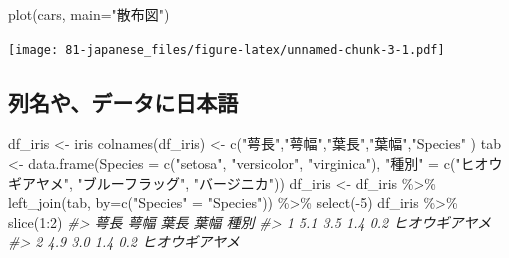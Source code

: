 \documentclass[
]{bxjsbook}
\newenvironment{Shaded}{\begin{snugshade}}{\end{snugshade}}
\newcommand{\AttributeTok}[1]{\textcolor[rgb]{0.77,0.63,0.00}{#1}}
\newcommand{\CommentTok}[1]{\textcolor[rgb]{0.56,0.35,0.01}{\textit{#1}}}
\newcommand{\DecValTok}[1]{\textcolor[rgb]{0.00,0.00,0.81}{#1}}
\newcommand{\FunctionTok}[1]{\textcolor[rgb]{0.00,0.00,0.00}{#1}}
\newcommand{\NormalTok}[1]{#1}
\newcommand{\OtherTok}[1]{\textcolor[rgb]{0.56,0.35,0.01}{#1}}
\newcommand{\SpecialCharTok}[1]{\textcolor[rgb]{0.00,0.00,0.00}{#1}}
\newcommand{\StringTok}[1]{\textcolor[rgb]{0.31,0.60,0.02}{#1}}
\theoremstyle{definition}
\theoremstyle{definition}
\theoremstyle{definition}
\theoremstyle{definition}
\theoremstyle{remark}
\begin{document}
\begin{Shaded}
\begin{Highlighting}[]
\FunctionTok{plot}\NormalTok{(cars, }\AttributeTok{main=}\StringTok{"散布図"}\NormalTok{)}
\end{Highlighting}
\end{Shaded}

\texttt{[image: 81-japanese\_files/figure-latex/unnamed-chunk-3-1.pdf]}

\hypertarget{ux5217ux540dux3084ux30c7ux30fcux30bfux306bux65e5ux672cux8a9e}{%
\subsection{列名や、データに日本語}\label{ux5217ux540dux3084ux30c7ux30fcux30bfux306bux65e5ux672cux8a9e}}

\begin{Shaded}
\begin{Highlighting}[]
\NormalTok{df\_iris }\OtherTok{\textless{}{-}}\NormalTok{ iris}
\FunctionTok{colnames}\NormalTok{(df\_iris) }\OtherTok{\textless{}{-}} \FunctionTok{c}\NormalTok{(}\StringTok{"萼長"}\NormalTok{,}\StringTok{"萼幅"}\NormalTok{,}\StringTok{"葉長"}\NormalTok{,}\StringTok{"葉幅"}\NormalTok{,}\StringTok{"Species"}\NormalTok{ )}
\NormalTok{tab }\OtherTok{\textless{}{-}} \FunctionTok{data.frame}\NormalTok{(}\AttributeTok{Species =} \FunctionTok{c}\NormalTok{(}\StringTok{"setosa"}\NormalTok{, }\StringTok{"versicolor"}\NormalTok{, }\StringTok{"virginica"}\NormalTok{), }
                  \StringTok{"種別"} \OtherTok{=} \FunctionTok{c}\NormalTok{(}\StringTok{"ヒオウギアヤメ"}\NormalTok{, }\StringTok{"ブルーフラッグ"}\NormalTok{, }\StringTok{"バージニカ"}\NormalTok{))}
\NormalTok{df\_iris }\OtherTok{\textless{}{-}}\NormalTok{ df\_iris }\SpecialCharTok{\%\textgreater{}\%} \FunctionTok{left\_join}\NormalTok{(tab, }\AttributeTok{by=}\FunctionTok{c}\NormalTok{(}\StringTok{"Species"} \OtherTok{=} \StringTok{"Species"}\NormalTok{)) }\SpecialCharTok{\%\textgreater{}\%} \FunctionTok{select}\NormalTok{(}\SpecialCharTok{{-}}\DecValTok{5}\NormalTok{)}
\NormalTok{df\_iris }\SpecialCharTok{\%\textgreater{}\%} \FunctionTok{slice}\NormalTok{(}\DecValTok{1}\SpecialCharTok{:}\DecValTok{2}\NormalTok{)}
\CommentTok{\#\textgreater{}   萼長 萼幅 葉長 葉幅           種別}
\CommentTok{\#\textgreater{} 1  5.1  3.5  1.4  0.2 ヒオウギアヤメ}
\CommentTok{\#\textgreater{} 2  4.9  3.0  1.4  0.2 ヒオウギアヤメ}
\end{Highlighting}
\end{Shaded}
\end{document}
